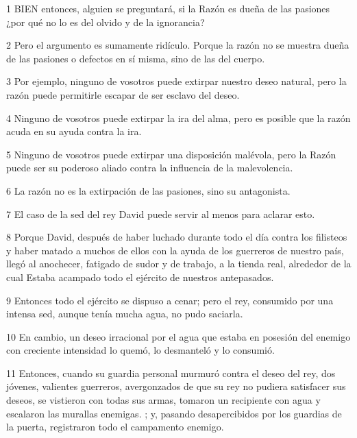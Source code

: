 \par 1 BIEN entonces, alguien se preguntará, si la Razón es dueña de las pasiones ¿por qué no lo es del olvido y de la ignorancia?

\par 2 Pero el argumento es sumamente ridículo. Porque la razón no se muestra dueña de las pasiones o defectos en sí misma, sino de las del cuerpo.

\par 3 Por ejemplo, ninguno de vosotros puede extirpar nuestro deseo natural, pero la razón puede permitirle escapar de ser esclavo del deseo.

\par 4 Ninguno de vosotros puede extirpar la ira del alma, pero es posible que la razón acuda en su ayuda contra la ira.

\par 5 Ninguno de vosotros puede extirpar una disposición malévola, pero la Razón puede ser su poderoso aliado contra la influencia de la malevolencia.

\par 6 La razón no es la extirpación de las pasiones, sino su antagonista.

\par 7 El caso de la sed del rey David puede servir al menos para aclarar esto.

\par 8 Porque David, después de haber luchado durante todo el día contra los filisteos y haber matado a muchos de ellos con la ayuda de los guerreros de nuestro país, llegó al anochecer, fatigado de sudor y de trabajo, a la tienda real, alrededor de la cual Estaba acampado todo el ejército de nuestros antepasados.

\par 9 Entonces todo el ejército se dispuso a cenar; pero el rey, consumido por una intensa sed, aunque tenía mucha agua, no pudo saciarla.

\par 10 En cambio, un deseo irracional por el agua que estaba en posesión del enemigo con creciente intensidad lo quemó, lo desmanteló y lo consumió.

\par 11 Entonces, cuando su guardia personal murmuró contra el deseo del rey, dos jóvenes, valientes guerreros, avergonzados de que su rey no pudiera satisfacer sus deseos, se vistieron con todas sus armas, tomaron un recipiente con agua y escalaron las murallas enemigas. ; y, pasando desapercibidos por los guardias de la puerta, registraron todo el campamento enemigo.

